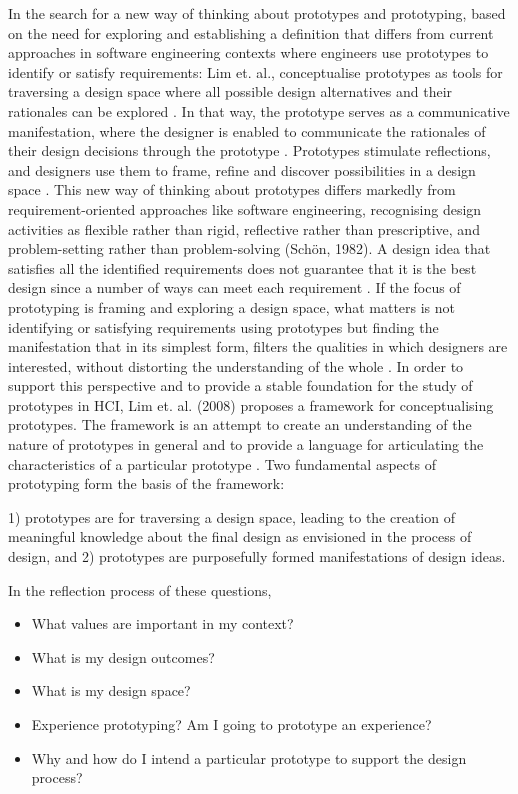 In the search for a new way of thinking about prototypes and prototyping, based on the need for exploring and establishing a definition that differs from current approaches in software engineering contexts where engineers use prototypes to identify or satisfy requirements: Lim et. al., conceptualise prototypes as tools for traversing a design space where all possible design alternatives and their rationales can be explored \autocite[p. 2]{lim_anatomy_2008}. In that way, the prototype serves as a communicative manifestation, where the designer is enabled to communicate the rationales of their design decisions through the prototype \autocite[p. 2]{lim_anatomy_2008}. Prototypes stimulate reflections, and designers use them to frame, refine and discover possibilities in a design space \autocite[p. 2]{lim_anatomy_2008}. This new way of thinking about prototypes differs markedly from requirement-oriented approaches like software engineering, recognising design activities as flexible rather than rigid, reflective rather than prescriptive, and problem-setting rather than problem-solving (Schön, 1982). A design idea that satisfies all the identified requirements does not guarantee that it is the best design since a number of ways can meet each requirement \autocite[p. 2]{lim_anatomy_2008}. If the focus of prototyping is framing and exploring a design space, what matters is not identifying or satisfying requirements using prototypes but finding the manifestation that in its simplest form, filters the qualities in which designers are interested, without distorting the understanding of the whole \autocite[p. 2]{lim_anatomy_2008}. In order to support this perspective and to provide a stable foundation for the study of prototypes in HCI, Lim et. al. (2008) proposes a framework for conceptualising prototypes. The framework is an attempt to create an understanding of the nature of prototypes in general and to provide a language for articulating the characteristics of a particular prototype \autocite[p. 3]{lim_anatomy_2008}. Two fundamental aspects of prototyping form the basis of the framework:

1) prototypes are for traversing a design space, leading to the creation of meaningful knowledge about the final design as envisioned in the process of design, and
2) prototypes are purposefully formed manifestations of design ideas.
\autocite[p. 3]{lim_anatomy_2008}

In the reflection process of these questions,
\begin{itemize}
    \item What values are important in my context?
    \item What is my design outcomes?
    \item What is my design space?
    \item Experience prototyping? Am I going to prototype an experience?
    \item Why and how do I intend a particular prototype to support the design process?
\end{itemize}

